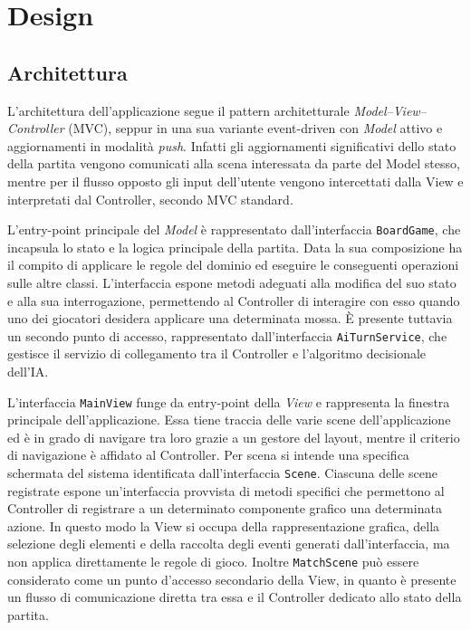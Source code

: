 \chapter{Design}

\section{Architettura}

L'architettura dell'applicazione segue il pattern architetturale \textit{Model--View--Controller}
(MVC), seppur in una sua variante event-driven con \textit{Model} attivo e aggiornamenti
in modalità \textit{push}. Infatti gli aggiornamenti significativi dello stato della partita vengono
comunicati alla scena interessata da parte del Model stesso, mentre per il flusso opposto
gli input dell'utente vengono intercettati dalla View e interpretati dal Controller,
secondo MVC standard.

L'entry-point principale del \textit{Model} è rappresentato dall'interfaccia \texttt{Board\-Game},
che incapsula lo stato e la logica principale della partita. Data la sua composizione ha
il compito di applicare le regole del dominio ed eseguire le conseguenti operazioni sulle altre classi.
L'interfaccia espone metodi adeguati alla modifica del suo stato e alla sua interrogazione, permettendo
al Controller di interagire con esso quando uno dei giocatori desidera applicare una determinata mossa.
È presente tuttavia un secondo punto di accesso, rappresentato dall'interfaccia \texttt{AiTurnService},
che gestisce il servizio di collegamento tra il Controller e l'algoritmo decisionale dell'IA\@.

L'interfaccia \texttt{MainView} funge da entry-point della \textit{View} e rappresenta la finestra principale
dell'applicazione. Essa tiene traccia delle varie scene dell'applicazione ed è in grado di navigare tra loro grazie a un
gestore del layout, mentre il criterio di navigazione è affidato al Controller. Per scena si intende una specifica
schermata del sistema identificata dall'interfaccia \texttt{Scene}. Ciascuna delle scene registrate espone
un'interfaccia provvista di metodi specifici che permettono al Controller di registrare a un determinato
componente grafico una determinata azione. In questo modo la View si occupa della rappresentazione grafica, della
selezione degli elementi e della raccolta degli eventi generati dall'interfaccia, ma non applica direttamente
le regole di gioco. Inoltre \texttt{MatchScene} può essere considerato come un punto d'accesso secondario
della View, in quanto è presente un flusso di comunicazione diretta tra essa e il Controller dedicato allo
stato della partita.

